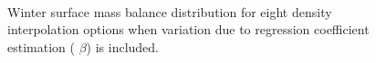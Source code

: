 \documentclass[12pt]{article}
\begin{document}
\begin{figure}[H]
	\centering
	\\
	\caption{Winter surface mass balance distribution for eight density interpolation options when variation due to regression coefficient estimation ( $\beta$) is included. }
	\label{fig:WSMB_Distributionbeta}
\end{figure}
\end{document}
